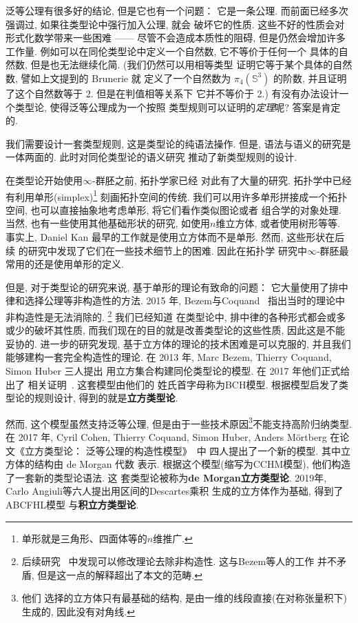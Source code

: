 泛等公理有很多好的结论, 但是它也有一个问题： 它是一条公理.
而前面已经多次强调过, 如果往类型论中强行加入公理, 就会
破坏它的性质. 这些不好的性质会对形式化数学带来一些困难
------ 尽管不会造成本质性的阻碍, 但是仍然会增加许多工作量.
例如可以在同伦类型论中定义一个自然数, 它不等价于任何一个
具体的自然数, 但是也无法继续化简. (我们仍然可以用相等类型
证明它等于某个具体的自然数, 譬如上文提到的 Brunerie 就
定义了一个自然数为 \(\pi_4(\mathbb S^3)\) 的阶数,
并且证明了这个自然数等于 \(2\). 但是在判值相等关系下
它并不等价于 2.)
有没有办法设计一个类型论, 使得泛等公理成为一个按照
类型规则可以证明的\emph{定理}呢? 答案是肯定的.

我们需要设计一套类型规则, 这是类型论的纯语法操作. 但是,
语法与语义的研究是一体两面的. 此时对同伦类型论的语义研究
推动了新类型规则的设计.

在类型论开始使用\(\infty\)-群胚之前, 拓扑学家已经
对此有了大量的研究. 拓扑学中已经有利用单形(simplex)\footnote{单形就是三角形、四面体等的\(n\)维推广.}
刻画拓扑空间的传统. 我们可以用许多单形拼接成一个拓扑空间,
也可以直接抽象地考虑单形, 将它们看作类似图论或者
组合学的对象处理. 当然, 也有一些使用其他基础形状的研究,
如使用\(n\)维立方体, 或者使用树形等等. 事实上, Daniel Kan
最早的工作就是使用立方体而不是单形. 然而, 这些形状在后续
的研究中发现了它们在一些技术细节上的困难. 因此在拓扑学
研究中\(\infty\)-群胚最常用的还是使用单形的定义.

但是, 对于类型论的研究来说, 基于单形的理论有致命的问题：
它大量使用了排中律和选择公理等非构造性的方法. 2015
年, Bezem与Coquand~\cite{bezem:2015:simplicial}
指出当时的理论中非构造性是无法消除的.%
\footnote{后续研究~\cite{henry:2019:constructive}
中发现可以修改理论去除非构造性. 这与Bezem等人的工作
并不矛盾, 但是这一点的解释超出了本文的范畴.} 我们已经知道
在类型论中, 排中律的各种形式都会或多或少的破坏其性质,
而我们现在的目的就是改善类型论的这些性质, 因此这是不能妥协的.
进一步的研究发现, 基于立方体的理论的技术困难是可以克服的,
并且我们能够建构一套完全构造性的理论. 在 2013 年,
Marc Bezem, Thierry Coquand, Simon Huber 三人提出
用立方集合构建同伦类型论的模型. 在 2017 年他们正式给出了
相关证明~\cite{bch:2017:cubical}. 这套模型由他们的
姓氏首字母称为BCH模型. 根据模型启发了类型论的规则设计,
得到的就是\textbf{立方类型论}.

然而, 这个模型虽然支持泛等公理, 但是由于一些技术原因\footnote{他们
选择的立方体只有最基础的结构, 是由一维的线段直接(在对称张量积下)生成的,
因此没有对角线.}不能支持高阶归纳类型. 在 2017 年,
Cyril Cohen, Thierry Coquand, Simon Huber, Anders M\"ortberg
在论文《立方类型论： 泛等公理的构造性模型》~\cite{abcfhl:2021:cubical}中
四人提出了一个新的模型. 其中立方体的结构由 de Morgan 代数
表示. 根据这个模型(缩写为CCHM模型), 他们构造了一套新的类型论语法. 这
套类型论被称为\textbf{de Morgan立方类型论}.
2019年, Carlo Angiuli等六人提出用区间的Descartes乘积
生成的立方体作为基础, 得到了ABCFHL模型
与\textbf{积立方类型论}.

